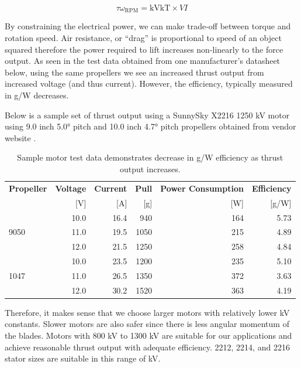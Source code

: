 $$
\tau\omega_{\mathrm{RPM}} = \mathrm{kV}\mathrm{kT}\times VI
$$

By constraining the electrical power, we can make trade-off between torque and rotation speed.
Air resistance, or “drag” is proportional to speed of an object squared therefore the power required to 
lift increases non-linearly to the force output. As seen in the test data obtained from one manufacturer’s 
datasheet below, using the same propellers we see an increased thrust output from increased voltage (and 
thus current). However, the efficiency, typically measured in g/W decreases. 

Below is a sample set of thrust output using a SunnySky X2216 1250 kV motor using 9.0 inch 5.0\si{\degree} pitch and 10.0 inch 4.7\si{\degree} pitch propellers obtained from vendor website \cite{sunnysky-2216}. 

\begin{table}[H]
    \centering
    \caption{Sample motor test data demonstrates decrease in g/W efficiency as thrust output increases.}
    \label{table:sunnyskyx2216-table}

    \begin{tabular}{lrrrrr}

    \hline
    \textbf{Propeller} & \textbf{Voltage} & \textbf{Current} & \textbf{Pull}  & \textbf{Power Consumption} & \textbf{Efficiency}\\
    & [V] & [A] & [g] & [W] & [g/W] \\
    \hline
     & 10.0 & 16.4 & 940 & 164 & 5.73 \\
    9050 & 11.0 & 19.5 & 1050 & 215 & 4.89 \\
     & 12.0 & 21.5 & 1250 & 258 & 4.84 \\
    \hline
     & 10.0 & 23.5 & 1200 & 235 & 5.10 \\
    1047 & 11.0 & 26.5 & 1350 & 372 & 3.63 \\
     & 12.0 & 30.2 & 1520 & 363 & 4.19 \\
    \hline

    \end{tabular} 
\end{table}

Therefore, it makes sense that we choose larger motors with relatively lower kV constants. Slower motors 
are also safer since there is less angular momentum of the blades. Motors with 800 kV to 1300 kV are 
suitable for our applications and achieve reasonable thrust output with adequate efficiency. 2212, 2214, 
and 2216 stator sizes are suitable in this range of kV.

